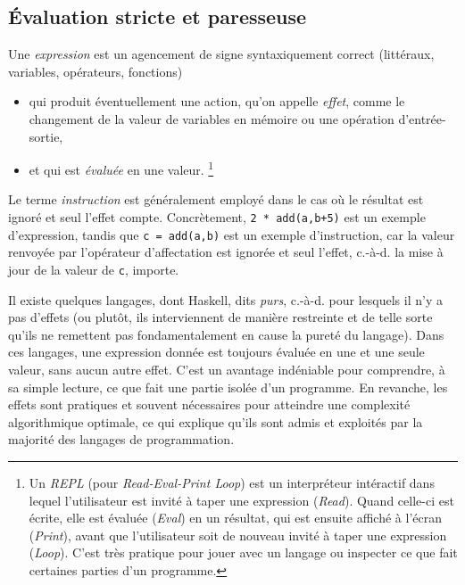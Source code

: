 \documentclass[a4paper,francais]{insalyon}
\newcommand{\cad}{c.-à-d.}
\begin{document}
\subsection{\'Evaluation stricte et paresseuse}


Une \emph{expression} est un agencement de signe syntaxiquement correct (littéraux, variables, opérateurs, fonctions)
\begin{itemize}
\item qui produit éventuellement une action, qu'on appelle \emph{effet}, comme le changement de la valeur de variables en mémoire ou une opération d'entrée-sortie, 
\item et qui est \emph{évaluée} en une valeur. \footnote{
Un \emph{REPL} (pour \emph{Read-Eval-Print Loop}) est un interpréteur intéractif dans lequel l'utilisateur est invité à taper une expression (\emph{Read}). Quand celle-ci est écrite, elle est évaluée (\emph{Eval}) en un résultat, qui est ensuite affiché à l'écran (\emph{Print}), avant que l'utilisateur soit de nouveau invité à taper une expression (\emph{Loop}). C'est très pratique pour jouer avec un langage ou inspecter ce que fait certaines parties d'un programme. 
}
\end{itemize}
Le terme \emph{instruction} est généralement employé dans le cas où le résultat est ignoré et seul l'effet compte. Concrètement, \verb!2 * add(a,b+5)! est un exemple d'expression, tandis que \verb!c = add(a,b)! est un exemple d'instruction, car la valeur renvoyée par l'opérateur d'affectation est ignorée et seul l'effet, {\cad} la mise à jour de la valeur de \texttt{c}, importe.   

Il existe quelques langages, dont Haskell, dits \emph{purs}, {\cad} pour lesquels il n'y a pas d'effets (ou plutôt, ils interviennent de manière restreinte et de telle sorte qu'ils ne remettent pas fondamentalement en cause la pureté du langage). Dans ces langages, une expression donnée est toujours évaluée en une et une seule valeur, sans aucun autre effet. C'est un avantage indéniable pour comprendre, à sa simple lecture, ce que fait une partie isolée d'un programme. En revanche, les effets sont pratiques et souvent nécessaires pour atteindre une complexité algorithmique optimale, ce qui explique qu'ils sont admis et exploités par la majorité des langages de programmation.    
\end{document}
